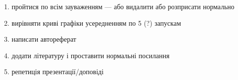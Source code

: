 \begin{enumerate}
    \item пройтися по всім зауваженням --- або видалити або розприсати нормально
    \item вирівняти криві графіки усередненням по 5 (?) запускам
    \item написати автореферат
    \item додати літературу і проставити нормальні посилання
    \item репетиція презентації/доповіді
\end{enumerate} 